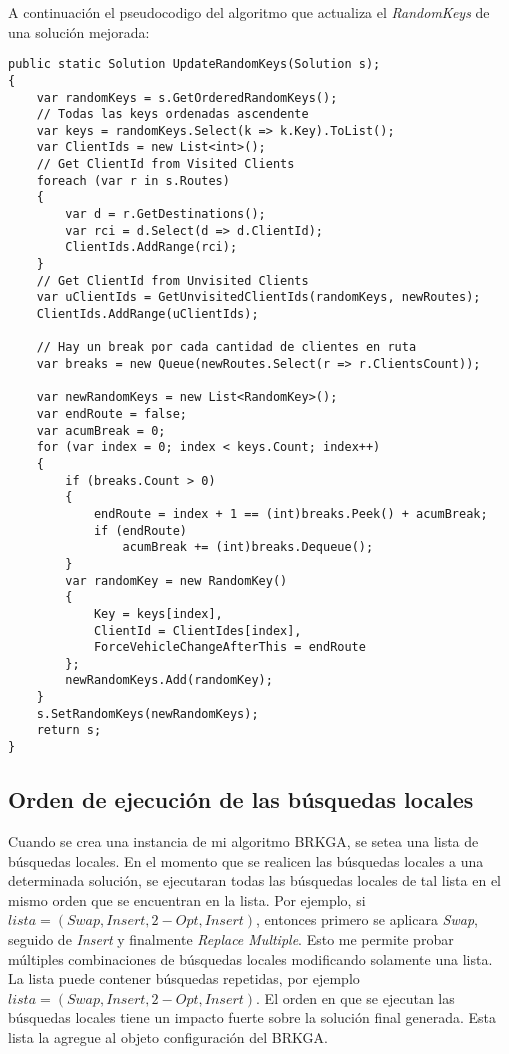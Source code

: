\bigskip

A continuación el pseudocodigo del algoritmo que actualiza el \textit{RandomKeys} de una solución mejorada:

\begin{minipage}{\textwidth}
\begin{lstlisting}
public static Solution UpdateRandomKeys(Solution s);
{
	var randomKeys = s.GetOrderedRandomKeys();
	// Todas las keys ordenadas ascendente
	var keys = randomKeys.Select(k => k.Key).ToList();
	var ClientIds = new List<int>();
	// Get ClientId from Visited Clients
	foreach (var r in s.Routes)
	{
		var d = r.GetDestinations();
		var rci = d.Select(d => d.ClientId);
		ClientIds.AddRange(rci);
	}
	// Get ClientId from Unvisited Clients
	var uClientIds = GetUnvisitedClientIds(randomKeys, newRoutes);
	ClientIds.AddRange(uClientIds);

	// Hay un break por cada cantidad de clientes en ruta 
	var breaks = new Queue(newRoutes.Select(r => r.ClientsCount));

	var newRandomKeys = new List<RandomKey>();
	var endRoute = false;
	var acumBreak = 0;
	for (var index = 0; index < keys.Count; index++)
	{
		if (breaks.Count > 0)
		{		
			endRoute = index + 1 == (int)breaks.Peek() + acumBreak;
			if (endRoute)
				acumBreak += (int)breaks.Dequeue();
		}		
		var randomKey = new RandomKey()
		{
			Key = keys[index],
			ClientId = ClientIdes[index],
			ForceVehicleChangeAfterThis = endRoute
		};
		newRandomKeys.Add(randomKey);
	}
	s.SetRandomKeys(newRandomKeys);
	return s;
}
\end{lstlisting}
\end{minipage}

\subsection{Orden de ejecución de las búsquedas locales}

Cuando se crea una instancia de mi algoritmo BRKGA, se setea una lista de búsquedas locales. En el momento que se realicen las búsquedas locales a una determinada solución, se ejecutaran todas las búsquedas locales de tal lista en el mismo orden que se encuentran en la lista. Por ejemplo, si $lista = (Swap, Insert, 2-Opt, Insert)$, entonces primero se aplicara \textit{Swap}, seguido de \textit{Insert} y finalmente \textit{Replace Multiple}. Esto me permite probar múltiples combinaciones de búsquedas locales modificando solamente una lista. La lista puede contener búsquedas repetidas, por ejemplo $lista = (Swap, Insert, 2-Opt, Insert)$. El orden en que se ejecutan las búsquedas locales tiene un impacto fuerte sobre la solución final generada. Esta lista la agregue al objeto configuración del BRKGA.

